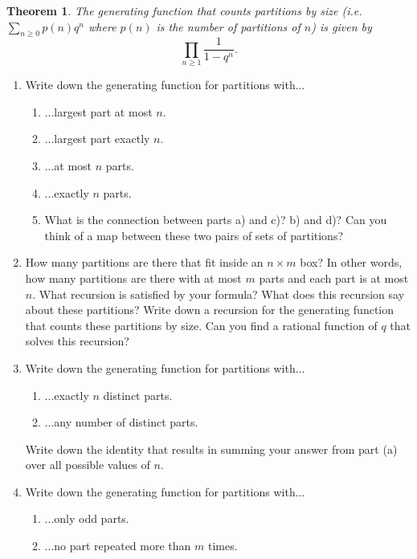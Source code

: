 \documentclass[10pt]{article}
\newtheorem{theorem}{Theorem}
\newcounter{lastexercise}
\newenvironment{exercises}
  {\begin{enumerate}
    \setcounter{enumi}\thelastexercise}
{\setcounter{lastexercise}\theenumi\end{enumerate}}
\begin{document}
\begin{theorem}
The generating function that counts partitions by size (i.e. $\sum_{n \geq 0} p(n) q^n$ where $p(n)$ is the number of partitions of $n$) is given by
$$\prod_{n\geq 1} \frac{1}{1-q^n}.$$
\end{theorem}



\begin{exercises}
\item Write down the generating function for partitions with...
\begin{enumerate}
\item ...largest part at most $n$.
\item ...largest part exactly $n$.
\item ...at most $n$ parts.
\item ...exactly $n$ parts.
\item What is the connection between parts a) and c)?  b) and d)?  Can you think of a map between these two pairs of sets of partitions?
\end{enumerate}

\item How many partitions are there that fit inside an $n \times m$ box?  In other words, how many partitions are there with at most $m$ parts and each part is at most $n$.  What recursion is satisfied by your formula?  What does this recursion say about these partitions?  Write down a recursion for the generating function that counts these partitions by size.  Can you find a rational function of $q$ that solves this recursion?

\item Write down the generating function for partitions with...
\begin{enumerate}
\item ...exactly $n$ distinct parts.
\item ...any number of distinct parts.
\end{enumerate}
Write down the identity that results in summing your answer from part (a) over all possible values of $n$.\label{distinctparts}

 
\item Write down the generating function for partitions with...
\begin{enumerate}
\item ...only odd parts.
\item ...no part repeated more than $m$ times.
\end{enumerate}


\end{exercises}
\end{document}

